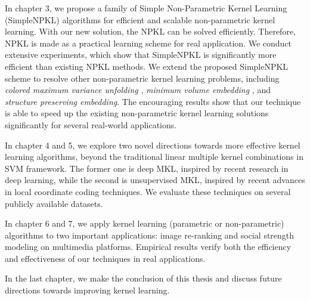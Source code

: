 
In chapter 3, we propose a family of Simple Non-Parametric Kernel Learning (SimpleNPKL) algorithms for efficient and scalable non-parametric kernel learning.  With our new solution, the NPKL can be solved efficiently. Therefore, NPKL is made as a practical learning scheme for real application. We conduct extensive experiments, which show that SimpleNPKL is significantly more efficient than existing NPKL methods. We extend the proposed SimpleNPKL scheme to resolve other non-parametric kernel learning problems, including {\em colored maximum variance unfolding} \cite{nips/SongSBG07}, {\em minimum volume embedding} \cite{aistats/ShawJ07}, and {\em structure preserving embedding}\cite{icml/ShawJ09}. The encouraging results show that our technique is able to speed up the existing non-parametric kernel learning solutions significantly for several real-world applications.

In chapter 4 and 5, we explore two novel directions towards more effective kernel learning algorithms, beyond the traditional linear multiple kernel combinations in SVM framework. The former one is deep MKL, inspired by recent research in deep learning, while the second is unsupervised MKL, inspired by recent advances in local coordinate coding techniques. We evaluate these techniques on several publicly available datasets.

In chapter 6 and 7, we apply kernel learning (parametric or non-parametric) algorithms to two important applications: image re-ranking and social strength modeling on multimedia platforms. Empirical results verify both the efficiency and effectiveness of our techniques in real applications.

In the last chapter, we make the conclusion of this thesis and discuss future directions towards improving kernel learning.

